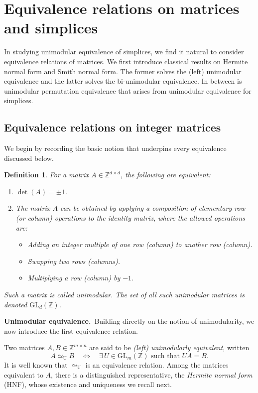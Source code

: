 \documentclass[reqno, 12pt]{article}
\theoremstyle{mydefinition}
\newtheorem{dfn}[thm]{Definition}
\theoremstyle{myremark}
\numberwithin{algorithm}{section}
\def\Z{\mathbb{Z}}
\begin{document}
\section{Equivalence relations on matrices and simplices}
In studying unimodular equivalence of simplices, we find it natural to consider equivalence relations of matrices.
We first introduce classical results on Hermite normal form and Smith normal form. The former solves the (left) unimodular equivalence
and the latter solves the bi-unimodular equivalence. In between is unimodular permutation equivalence that arises from
unimodular equivalence for simplices.


\subsection{Equivalence relations on integer matrices}
We begin by recording the basic notion that underpins every equivalence discussed below.
\begin{dfn}
For a matrix $A \in \mathbb{Z}^{d \times d}$, the following are equivalent:
\begin{enumerate}
\item $\det(A) = \pm 1$.
\item The matrix $A$ can be obtained by applying a composition of elementary row (or column) operations to the identity matrix, where the allowed operations are:
    \begin{itemize}
        \item Adding an integer multiple of one row (column) to another row (column).
        \item Swapping two rows (columns).
        \item Multiplying a row (column) by $-1$.
    \end{itemize}
\end{enumerate}
Such a matrix is called \emph{unimodular}. The set of all such unimodular matrices is denoted $\mathrm{GL}_d(\Z)$.
\end{dfn}

\medskip
\noindent\textbf{Unimodular equivalence.}\
Building directly on the notion of unimodularity, we now introduce the first equivalence relation.

Two matrices $A,B\in\Z^{m\times n}$ are said to be \emph{(left) unimodularly equivalent}, written
\[
A \simeq_{\mathrm{U}} B \quad\iff\quad \exists\, U \in \mathrm{GL}_m(\Z) \text{ such that } UA = B.
\]
It is well known that $\simeq_{\mathrm{U}}$ is an equivalence relation.
Among the matrices equivalent to $A$, there is a distinguished representative, the \emph{Hermite normal form } (HNF), whose existence and uniqueness we recall next.
\end{document}
